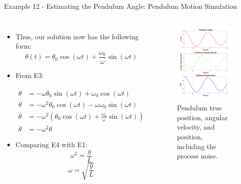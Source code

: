 \begin{frame}{Example 12 - Estimating the Pendulum Angle: Pendulum Motion Simulation}
\begin{columns}
\begin{itemize}
    \item Thus, our solution now has the following form:
\[
\theta(t) = \theta_0 \cos(\omega t) + \frac{\omega_0}{\omega} \sin(\omega t) \tag{E3}
\]

\item From E3:

\begin{align*}
    \dot{\theta} & = -\omega \theta_0 \sin(\omega t) + \omega_0 \cos(\omega t) \\
    \ddot{\theta} & = -\omega^2 \theta_0 \cos(\omega t) - \omega \omega_0 \sin(\omega t) \\
    \ddot{\theta} &= -\omega^2 \left( \theta_0 \cos(\omega t) + \frac{\omega_0}{\omega} \sin(\omega t) \right) \\
    \ddot{\theta} &= -\omega^2 \theta \tag{E4}
\end{align*}
\item Comparing E4 with E1:
\[
\omega^2 = \frac{g}{L}
\]
\[
\omega = \sqrt{\frac{g}{L}}
\]
\end{itemize}
\vspace{-20pt}

\begin{figure}
    \centering
    \includegraphics[width=0.8\linewidth]{Figures//Part3/PendulumMotion.png}
    \vspace{-20pt}
    \caption{Pendulum true position, angular velocity, and position, including the process noise.}
    \label{fig:enter-label}
\end{figure}


\end{columns}
\end{frame}
